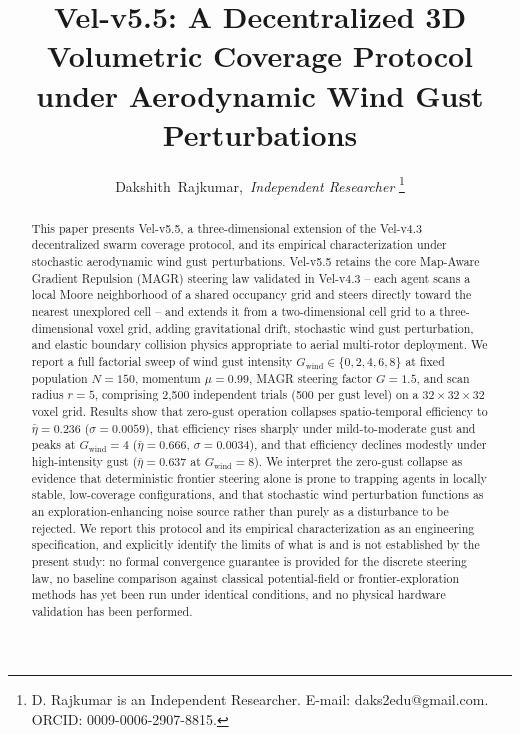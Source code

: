 \documentclass[10pt,journal]{IEEEtran}
\begin{document}
\title{Vel-v5.5: A Decentralized 3D Volumetric Coverage Protocol\\ under Aerodynamic Wind Gust Perturbations}

\author{Dakshith~Rajkumar,~\textit{Independent Researcher}
\thanks{D. Rajkumar is an Independent Researcher. E-mail: daks2edu@gmail.com. ORCID: 0009-0006-2907-8815.}}


\maketitle

\begin{abstract}
This paper presents Vel-v5.5, a three-dimensional extension of the Vel-v4.3
decentralized swarm coverage protocol, and its empirical characterization
under stochastic aerodynamic wind gust perturbations. Vel-v5.5 retains the
core Map-Aware Gradient Repulsion (MAGR) steering law validated in Vel-v4.3
-- each agent scans a local Moore neighborhood of a shared occupancy grid and
steers directly toward the nearest unexplored cell -- and extends it from a
two-dimensional cell grid to a three-dimensional voxel grid, adding
gravitational drift, stochastic wind gust perturbation, and elastic boundary
collision physics appropriate to aerial multi-rotor deployment. We report a
full factorial sweep of wind gust intensity $G_{\text{wind}} \in \{0, 2, 4,
6, 8\}$ at fixed population $N=150$, momentum $\mu=0.99$, MAGR steering
factor $G=1.5$, and scan radius $r=5$, comprising 2{,}500 independent trials
(500 per gust level) on a $32\times32\times32$ voxel grid. Results show that
zero-gust operation collapses spatio-temporal efficiency to
$\bar{\eta}=0.236$ ($\sigma=0.0059$), that efficiency rises sharply under
mild-to-moderate gust and peaks at $G_{\text{wind}}=4$
($\bar{\eta}=0.666$, $\sigma=0.0034$), and that efficiency declines modestly
under high-intensity gust ($\bar{\eta}=0.637$ at $G_{\text{wind}}=8$). We
interpret the zero-gust collapse as evidence that deterministic frontier
steering alone is prone to trapping agents in locally stable, low-coverage
configurations, and that stochastic wind perturbation functions as an
exploration-enhancing noise source rather than purely as a disturbance to be
rejected. We report this protocol and its empirical characterization as an
engineering specification, and explicitly identify the limits of what is
and is not established by the present study: no formal convergence
guarantee is provided for the discrete steering law, no baseline comparison
against classical potential-field or frontier-exploration methods has yet
been run under identical conditions, and no physical hardware validation
has been performed.
\end{abstract}
\end{document}
